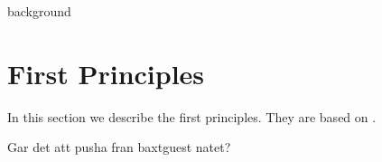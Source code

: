 background

\section{First Principles}
In this section we describe the first principles. They are based on \cite{ast_wit2011}.

Gar det att pusha fran baxtguest natet?